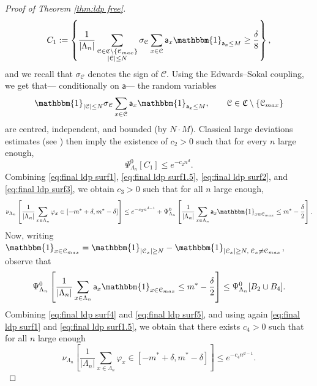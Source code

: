 \documentclass[11pt,a4paper]{article}
\theoremstyle{definition}
\numberwithin{equation}{section}
\begin{document}
\begin{proof}[Proof of Theorem \textup{\ref{thm:ldp free}}]
\begin{equation}
    C_1:=\left\{\frac{1}{|\Lambda_n|}\sum_{\substack{\mathcal{C}\in \mathfrak{C}\setminus \{\mathcal{C}_{\rm max}\}\\ |\mathcal{C}|\leq N}}\sigma_{\mathcal{C}}\sum_{x\in \mathcal{C}}\mathsf{a}_x\mathbbm{1}_{\mathsf{a}_x\leq M}\geq\frac{\delta}{8}\right\},
\end{equation}
and we recall that $\sigma_{\mathcal{C}}$ denotes the sign of $\mathcal{C}$.
Using the Edwards--Sokal coupling, we get that--- conditionally on $\mathsf{a}$--- the random variables
\begin{equation}
  \mathbbm{1}_{|\mathcal{C}|\leq N}\sigma_{\mathcal{C}}\sum_{x\in \mathcal{C}}\mathsf{a}_x\mathbbm{1}_{\mathsf{a}_x\leq M}, \qquad \mathcal{C}\in \mathfrak{C}\setminus\{\mathcal{C}_{\rm max}\}
\end{equation}
are centred, independent, and bounded (by $N\cdot M$). Classical large deviations estimates (see \cite{durrett2019probability}) then imply the existence of $c_2>0$ such that for every $n$ large enough,
\begin{equation}\label{eq:final ldp surf3}
    \Psi^0_{\Lambda_n}[C_1]\leq e^{-c_2n^d}.
\end{equation}
Combining \eqref{eq:final ldp surf1}, \eqref{eq:final ldp surf1.5}, \eqref{eq:final ldp surf2}, and \eqref{eq:final ldp surf3}, we obtain $c_3>0$ such that for all $n$ large enough,
\begin{equation}\label{eq:final ldp surf4}
    \nu_{\Lambda_n}\left[\frac{1}{|\Lambda_n|}\sum_{x\in \Lambda_n}\varphi_x\in [-m^*+\delta,m^*-\delta]\right]\leq e^{-c_3n^{d-1}}+\Psi^0_{\Lambda_n}\left[\frac{1}{|\Lambda_n|}\sum_{x\in \Lambda_n}\mathsf{a}_x\mathbbm{1}_{x\in \mathcal{C}_{\rm max}}\leq m^*-\frac{\delta}{2}\right].
\end{equation}
Now, writing $\mathbbm{1}_{x\in \mathcal{C}_{\rm max}}=\mathbbm{1}_{|\mathcal{C}_x|\geq N}-\mathbbm{1}_{|\mathcal{C}_x|\geq N, \: \mathcal{C}_x\neq \mathcal{C}_{\rm max}}$, observe that
\begin{equation}\label{eq:final ldp surf5}
    \Psi^0_{\Lambda_n}\left[\frac{1}{|\Lambda_n|}\sum_{x\in \Lambda_n}\mathsf{a}_x\mathbbm{1}_{x\in \mathcal{C}_{\rm max}}\leq m^*-\frac{\delta}{2}\right]\leq \Psi_{\Lambda_n}^0[B_2\cup B_4].
\end{equation}
Combining \eqref{eq:final ldp surf4} and \eqref{eq:final ldp surf5}, and using again \eqref{eq:final ldp surf1} and \eqref{eq:final ldp surf1.5}, we obtain that there exists $c_4>0$ such that for all $n$ large enough
\begin{equation}
    \nu_{\Lambda_n}\left[\frac{1}{|\Lambda_n|}\sum_{x\in \Lambda_n}\varphi_x\in [-m^*+\delta,m^*-\delta]\right]\leq e^{-c_4n^{d-1}}.
\end{equation}


\end{proof}
\end{document}
